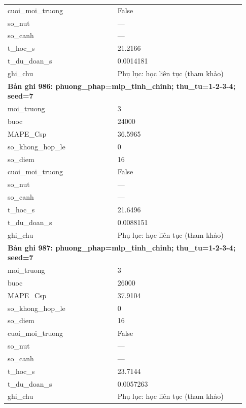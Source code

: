 \begin{longtable}{p{0.43\linewidth}p{0.50\linewidth}}
cuoi\_\allowbreak moi\_\allowbreak truong & False \\
so\_\allowbreak nut & — \\
so\_\allowbreak canh & — \\
t\_\allowbreak hoc\_\allowbreak s & 21.2166 \\
t\_\allowbreak du\_\allowbreak doan\_\allowbreak s & 0.0014181 \\
ghi\_\allowbreak chu & Phụ lục: học liên tục (tham khảo) \\
\midrule
\multicolumn{2}{p{0.95\linewidth}}{\textbf{Bản ghi 986: phuong\_phap=mlp\_tinh\_chinh; thu\_tu=1-2-3-4; seed=7}} \\
moi\_\allowbreak truong & 3 \\
buoc & 24000 \\
MAPE\_\allowbreak Csp & 36.5965 \\
so\_\allowbreak khong\_\allowbreak hop\_\allowbreak le & 0 \\
so\_\allowbreak diem & 16 \\
cuoi\_\allowbreak moi\_\allowbreak truong & False \\
so\_\allowbreak nut & — \\
so\_\allowbreak canh & — \\
t\_\allowbreak hoc\_\allowbreak s & 21.6496 \\
t\_\allowbreak du\_\allowbreak doan\_\allowbreak s & 0.0088151 \\
ghi\_\allowbreak chu & Phụ lục: học liên tục (tham khảo) \\
\midrule
\multicolumn{2}{p{0.95\linewidth}}{\textbf{Bản ghi 987: phuong\_phap=mlp\_tinh\_chinh; thu\_tu=1-2-3-4; seed=7}} \\
moi\_\allowbreak truong & 3 \\
buoc & 26000 \\
MAPE\_\allowbreak Csp & 37.9104 \\
so\_\allowbreak khong\_\allowbreak hop\_\allowbreak le & 0 \\
so\_\allowbreak diem & 16 \\
cuoi\_\allowbreak moi\_\allowbreak truong & False \\
so\_\allowbreak nut & — \\
so\_\allowbreak canh & — \\
t\_\allowbreak hoc\_\allowbreak s & 23.7144 \\
t\_\allowbreak du\_\allowbreak doan\_\allowbreak s & 0.0057263 \\
ghi\_\allowbreak chu & Phụ lục: học liên tục (tham khảo) \\

\end{longtable}
